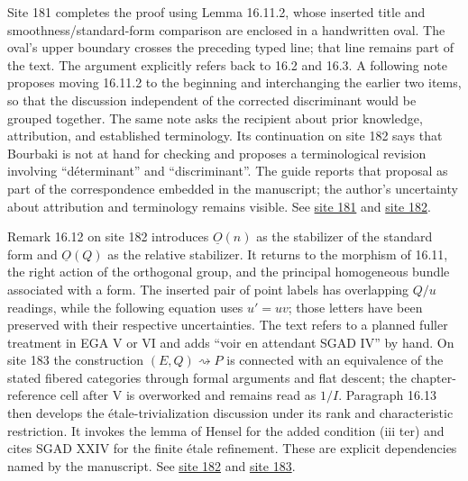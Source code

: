Site 181 completes the proof using Lemma 16.11.2, whose inserted title and smoothness/standard-form comparison are enclosed in a handwritten oval. The oval's upper boundary crosses the preceding typed line; that line remains part of the text. The argument explicitly refers back to 16.2 and 16.3. A following note proposes moving 16.11.2 to the beginning and interchanging the earlier two items, so that the discussion independent of the corrected discriminant would be grouped together. The same note asks the recipient about prior knowledge, attribution, and established terminology. Its continuation on site 182 says that Bourbaki is not at hand for checking and proposes a terminological revision involving ``déterminant'' and ``discriminant''. The guide reports that proposal as part of the correspondence embedded in the manuscript; the author's uncertainty about attribution and terminology remains visible. See \href{https://grothendieck.umontpellier.fr/web/viewer.html?file=../25.pdf#page=182}{site 181} and \href{https://grothendieck.umontpellier.fr/web/viewer.html?file=../25.pdf#page=183}{site 182}.

Remark 16.12 on site 182 introduces \(\underline O(n)\) as the stabilizer of the standard form and \(\underline O(Q)\) as the relative stabilizer. It returns to the morphism of 16.11, the right action of the orthogonal group, and the principal homogeneous bundle associated with a form. The inserted pair of point labels has overlapping \(Q/u\) readings, while the following equation uses \(u'=uv\); those letters have been preserved with their respective uncertainties. The text refers to a planned fuller treatment in EGA V or VI and adds ``voir en attendant SGAD IV'' by hand. On site 183 the construction \((E,Q)\rightsquigarrow P\) is connected with an equivalence of the stated fibered categories through formal arguments and flat descent; the chapter-reference cell after V is overworked and remains read as \(1/I\). Paragraph 16.13 then develops the étale-trivialization discussion under its rank and characteristic restriction. It invokes the lemma of Hensel for the added condition (iii ter) and cites SGAD XXIV for the finite étale refinement. These are explicit dependencies named by the manuscript. See \href{https://grothendieck.umontpellier.fr/web/viewer.html?file=../25.pdf#page=183}{site 182} and \href{https://grothendieck.umontpellier.fr/web/viewer.html?file=../25.pdf#page=184}{site 183}.

